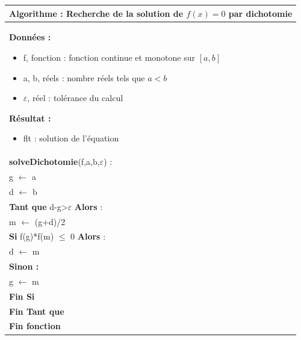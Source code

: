 \documentclass[10pt]{article}
\begin{document}
\begin{minipage}[c]{.48\linewidth}
\begin{pseudo}
\begin{center}
\begin{tabular}{p{}}
\hline
\textbf{Algorithme :} Recherche de la solution de $f(x)=0$ par dichotomie \\
\hline
\textbf{Données :}
\begin{itemize}
\item \textsf{f}, fonction : fonction continue et monotone sur $[a,b]$
\item \textsf{a, b}, réels : nombre réels tels que $a<b$
\item \textsf{$\varepsilon$}, réel : tolérance du calcul
\end{itemize}
\textbf{Résultat :} 
\begin{itemize}
\item flt : solution de l'équation
\end{itemize}
\\
\textbf{solveDichotomie}(\textsf{f,a,b,$\varepsilon$}) :\\
\hspace{.4cm}\textsf{g} $\leftarrow$ \textsf{a} \\
\hspace{.4cm}\textsf{d} $\leftarrow$ \textsf{b} \\
\hspace{.4cm}\textbf{Tant que} \textsf{d-g>$\varepsilon$} \textbf{Alors} : \\
\hspace{.8cm}\textsf{m} $\leftarrow$ \textsf{(g+d)/2} \\
\hspace{.8cm}\textbf{Si} \textsf{f(g)*f(m) $\leq$ 0} \textbf{Alors} : \\
\hspace{1.2cm}\textsf{d $\leftarrow$  m} \\
\hspace{.8cm} \textbf{Sinon :} \\
\hspace{1.2cm}\textsf{g $\leftarrow$  m} \\
\hspace{.8cm} \textbf{Fin Si}\\
\hspace{.4cm} \textbf{Fin Tant que}\\
\textbf{Fin fonction} \\
\hline
\end{tabular}
\end{center}

\end{pseudo}
\end{minipage}
\end{document}
